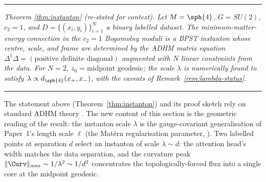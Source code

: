 \medskip
\hrule
\medskip

\emph{Theorem \ref{thm:instanton} (re-stated for context).} \emph{Let
$M=\sph{4}$, $G=SU(2)$, $c_2=1$, and $D=\{(x_i,y_i)\}_{i=1}^N$ a
binary labelled dataset. The minimum-matter-energy connection in the
$c_2=1$ Bogomolny moduli is a BPST instanton whose centre, scale, and
frame are determined by the ADHM matrix equation
$\Delta^\dagger\Delta = (\text{positive definite diagonal})$ augmented
with $N$ linear constraints from the data. For $N=2$,
$z_0=\text{midpoint geodesic}$; the scale $\lambda$ is numerically
found to satisfy $\lambda\propto d_{\sph{4}}(x_+,x_-)$, with the
caveats of Remark~\ref{rem:lambda-status}.}

\medskip
\hrule
\medskip

The statement above (Theorem~\ref{thm:instanton}) and its proof
sketch rely on standard ADHM theory
\cite{ADHM1978,Atiyah1979}. The new content of this section is the
geometric reading of the result: the instanton scale $\lambda$ is
the gauge-covariant generalisation of Paper~1's length scale $\ell$
(the Mat\'ern regularisation parameter,
\cite[Theorem~13.3]{Vasii2026Paper1}). Two labelled points at
separation $d$ select an instanton of scale $\lambda\sim d$: the
attention head's width matches the data separation, and the
curvature peak $\|\Curv\|_{\max}\sim 1/\lambda^2\sim 1/d^2$
concentrates the topologically-forced flux into a single core at the
midpoint geodesic.


